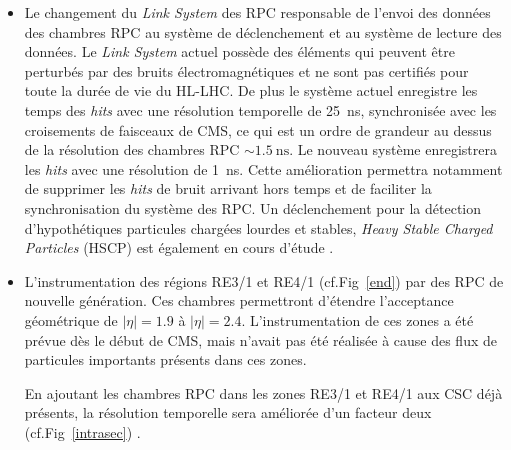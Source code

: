 \begin{itemize}[label=$\bullet$]
	\item Le changement du \textit{Link System} des RPC responsable de l'envoi des données des chambres RPC au système de déclenchement et au système de lecture des données. Le \textit{Link System} actuel possède des éléments qui peuvent être perturbés par des bruits électromagnétiques et ne sont pas certifiés pour toute la durée de vie du HL-LHC. De plus le système actuel enregistre les temps des \textit{hits} avec une résolution temporelle de \SI{25}{\nano\second}, synchronisée avec les croisements de faisceaux de CMS, ce qui est un ordre de grandeur au dessus de la résolution des chambres RPC $\sim\SI{1.5}{\nano\second}$. Le nouveau système enregistrera les \textit{hits} avec une résolution de \SI{1}{\nano\second}. Cette amélioration permettra notamment de supprimer les \textit{hits} de bruit arrivant hors temps et de faciliter la synchronisation du système des RPC. Un déclenchement pour la détection d'hypothétiques particules chargées lourdes et stables, \textit{Heavy Stable Charged Particles} (HSCP) est également en cours d'étude \cite{Lourenco:2283189}.
	
	\item L'instrumentation des régions RE3/1 et RE4/1 (cf.Fig~\ref{end}) par des RPC de nouvelle génération. Ces chambres permettront d'étendre l'acceptance géométrique de $|\eta|=\num{1.9}$ à  $|\eta|=\num{2.4}$. L'instrumentation de ces zones a été prévue dès le début de CMS, mais n'avait pas été réalisée à cause des flux de particules importants présents dans ces zones. 
	
	En ajoutant les chambres RPC dans les zones RE3/1 et RE4/1 aux CSC déjà présents, la résolution temporelle sera améliorée d'un facteur deux (cf.Fig~\ref{intrasec}) \cite{Lourenco:2283189}.
	

\end{itemize}
